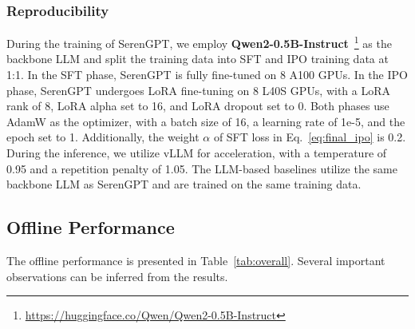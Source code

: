 \subsubsection{Reproducibility} During the training of SerenGPT, we employ \textbf{Qwen2-0.5B-Instruct}~\footnote{\url{https://huggingface.co/Qwen/Qwen2-0.5B-Instruct}} as the backbone LLM and split the training data into SFT and IPO training data at 1:1. In the SFT phase, SerenGPT is fully fine-tuned on 8 A100 GPUs. In the IPO phase, SerenGPT undergoes LoRA fine-tuning on 8 L40S GPUs, with a LoRA rank of 8, LoRA alpha set to 16, and LoRA dropout set to 0. Both phases use AdamW as the optimizer, with a batch size of 16, a learning rate of 1e-5, and the epoch set to 1. Additionally, the weight $\alpha$ of SFT loss in Eq.~\eqref{eq:final_ipo} is 0.2. During the inference, we utilize vLLM for acceleration, with a temperature of 0.95 and a repetition penalty of 1.05. The LLM-based baselines utilize the same backbone LLM as SerenGPT and are trained on the same training data.



\subsection{Offline Performance}
The offline performance is presented in Table~\ref{tab:overall}. Several important observations can be inferred from the results. 

